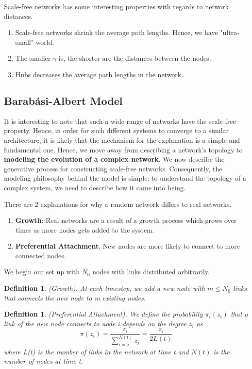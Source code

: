 \documentclass[twoside]{article}
\newtheorem{definition}[theorem]{Definition}
\begin{document}
Scale-free networks has some interesting properties with regards to network distances. 
\begin{enumerate}
\item Scale-free networks shrink the average path lengths. Hence, we have "ultra-small" world.
\item The smaller $\gamma$ is, the shorter are the distances between the nodes.
\item Hubs decreases the average path lengths in the network.
\end{enumerate}

\subsection{Barabási-Albert Model}

It is interesting to note that such a wide range of networks have the scale-free property. Hence, in order for such different systems to converge to a similar architecture, it is likely that the mechanism for the explanation is a simple and fundamental one. Hence, we move away from describing a network's topology to \textbf{modeling the evolution of a complex network}. We now describe the generative process for constructing scale-free networks. Consequently, the modeling philosophy behind the model is simple: to understand the topology of a complex system, we need to describe how it came into being.

There are 2 explanations for why a random network differs to real networks.
\begin{enumerate}
\item \textbf{Growth}: Real networks are a result of a growth process which grows over times as more nodes gets added to the system.
\item \textbf{Preferential Attachment}: New nodes are more likely to connect to more connected nodes.
\end{enumerate}

We begin our set up with $N_0$ nodes with links distributed arbitrarily.
\begin{definition}(Growth). At each timestep, we add a new node with $m \leq N_0$ links that connects the new node to m existing nodes.
\end{definition}


\begin{definition}(Preferential Attachment). We define the probability $\pi_i(z_i)$ that a link of the new node connects to node i depends on the degree $z_i$ as 
$$
\pi(z_i) = \frac{z_i}{\sum_{i=j}^{N(t)}z_j} = \frac{z_i}{2L(t)}
$$
where L(t) is the number of links in the network at time t and $N(t)$ is the number of nodes at time t.
\end{definition}
\end{document}
